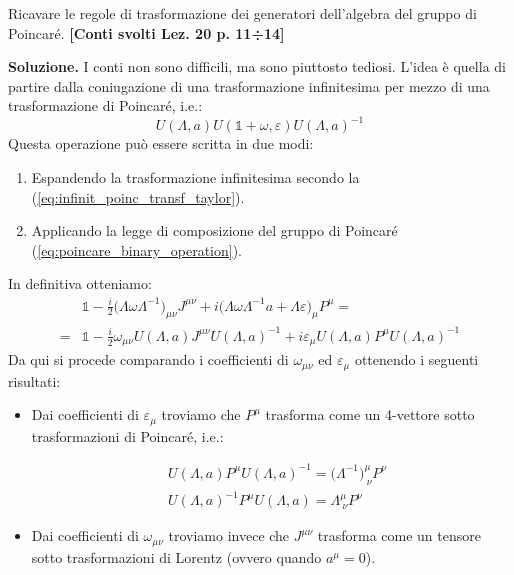 \documentclass[../main.tex]{subfiles}
\begin{document}
\begin{exercise}
    Ricavare le regole di trasformazione dei generatori dell'algebra del gruppo di Poincaré. \textbf{[Conti svolti Lez. 20 p. 11÷14]}

    \textbf{Soluzione. } I conti non sono difficili, ma sono piuttosto tediosi. L'idea è quella di partire dalla coniugazione di una trasformazione infinitesima per mezzo di una trasformazione di Poincaré, i.e.:
    \[ U(\Lambda, a) U(\mathbb 1 + \omega, \varepsilon) U(\Lambda, a)^{-1}\]
    Questa operazione può essere scritta in due modi:
    \begin{enumerate}
        \item Espandendo la trasformazione infinitesima secondo la (\ref{eq:infinit_poinc_transf_taylor}).
        \item Applicando la legge di composizione del gruppo di Poincaré (\ref{eq:poincare_binary_operation}).        
    \end{enumerate}
    In definitiva otteniamo:
    \begin{align*}
        &\mathbb 1 -\frac{i}{2}\big(\Lambda\omega\Lambda^{-1}\big)_{\mu\nu}J^{\mu\nu} + i\big(\Lambda\omega\Lambda^{-1}a +\Lambda\varepsilon\big)_\mu P^\mu =\\
        =& \mathbb 1 -\frac{i}{2}\omega_{\mu\nu}U(\Lambda, a)J^{\mu\nu}U(\Lambda, a)^{-1} +i\varepsilon_\mu U(\Lambda, a) P^\mu U(\Lambda, a)^{-1}
    \end{align*}
    Da qui si procede comparando i coefficienti di \(\omega_{\mu\nu}\) ed \(\varepsilon_{\mu}\) ottenendo i seguenti risultati:
    \begin{itemize}
        \item Dai coefficienti di \(\varepsilon_{\mu}\) troviamo che \(P^\mu\) trasforma come un 4-vettore sotto trasformazioni di Poincaré, i.e.: 
        
        \begin{equation}
            \boxed{
            \begin{aligned}
                &U(\Lambda, a) P^\mu U(\Lambda, a)^{-1} = \big(\Lambda^{-1}\big)^\mu_{~\nu}P^\nu \\
                &U(\Lambda, a)^{-1} P^\mu U(\Lambda, a) = \Lambda^\mu_{~\nu}P^\nu
            \end{aligned}}
            \label{eq:Pmu_transform_rules}
        \end{equation}
        \item Dai coefficienti di \(\omega_{\mu\nu}\) troviamo invece che \(J^{\mu\nu}\) trasforma come un tensore sotto trasformazioni di Lorentz (ovvero quando $a^\mu=0$).
        

\end{itemize}
\end{exercise}
\end{document}
